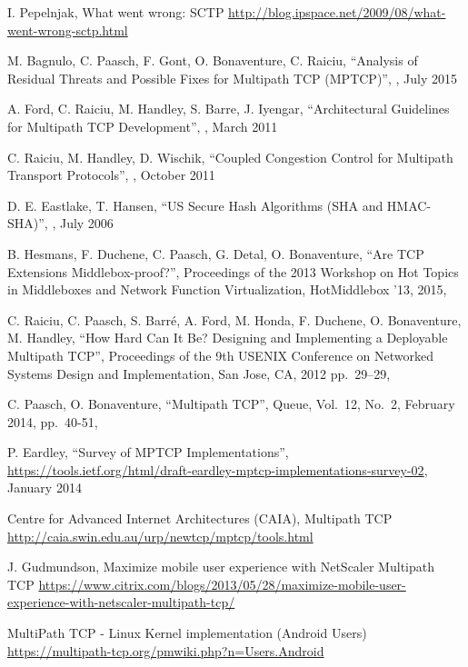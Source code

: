 \begin{thebibliography}{99}
I. Pepelnjak, What went wrong: SCTP
\url{http://blog.ipspace.net/2009/08/what-went-wrong-sctp.html}

M. Bagnulo, C. Paasch, F. Gont, O. Bonaventure, C. Raiciu,
``Analysis of Residual Threats and Possible Fixes for Multipath TCP (MPTCP)'',
,  July 2015

A. Ford, C. Raiciu, M. Handley, S. Barre, J. Iyengar,
``Architectural Guidelines for Multipath TCP Development'',
,  March 2011

C. Raiciu, M. Handley, D. Wischik,
``Coupled Congestion Control for Multipath Transport Protocols'',
,  October 2011

D. E. Eastlake, T. Hansen,
``US Secure Hash Algorithms (SHA and HMAC-SHA)'',
,  July 2006

B. Hesmans, F. Duchene, C. Paasch, G. Detal, O. Bonaventure, 
``Are TCP Extensions Middlebox-proof?'',
Proceedings of the 2013 Workshop on Hot Topics in Middleboxes and Network Function Virtualization, 
HotMiddlebox '13,
2015,

C. Raiciu, C. Paasch, S. Barr{\'e}, A. Ford, M. Honda, F. Duchene, O. Bonaventure, M. Handley, 
``How Hard Can It Be? Designing and Implementing a Deployable Multipath TCP'',
Proceedings of the 9th USENIX Conference on Networked Systems Design and Implementation,
San Jose, CA, 2012 
pp.\ 29--29, 

C. Paasch, O. Bonaventure, 
``Multipath TCP'', 
Queue, 
Vol.\ 12, No.\ 2, 
February 2014,
pp.\ 40-51,

P. Eardley,
``Survey of MPTCP Implementations'',
\url{https://tools.ietf.org/html/draft-eardley-mptcp-implementations-survey-02}, January 2014

Centre for Advanced Internet Architectures (CAIA), Multipath TCP
\url{http://caia.swin.edu.au/urp/newtcp/mptcp/tools.html}

J. Gudmundson, Maximize mobile user experience with NetScaler Multipath TCP
\url{https://www.citrix.com/blogs/2013/05/28/maximize-mobile-user-experience-with-netscaler-multipath-tcp/}

MultiPath TCP - Linux Kernel implementation (Android Users)
\url{https://multipath-tcp.org/pmwiki.php?n=Users.Android}


\end{thebibliography}
